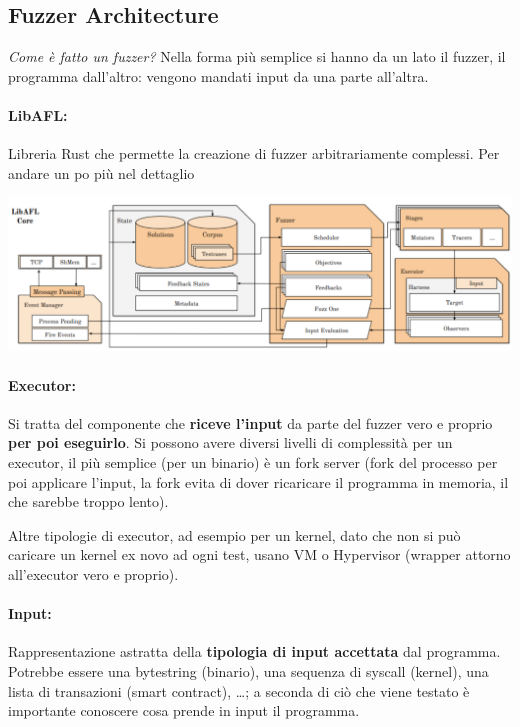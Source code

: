 \subsection{Fuzzer Architecture}

\textit{Come è fatto un fuzzer?} Nella forma più semplice si hanno da un lato il fuzzer, il programma dall'altro: vengono mandati input da una parte all'altra.

\paragraph{LibAFL:} Libreria Rust che permette la creazione di fuzzer arbitrariamente complessi. Per andare un po più nel dettaglio
\begin{center}
	\includegraphics[width=\linewidth]{img/fuzzing/fuzzercore}
\end{center}

\paragraph{Executor:} Si tratta del componente che \textbf{riceve l'input} da parte del fuzzer vero e proprio \textbf{per poi eseguirlo}. Si possono avere diversi livelli di complessità per un executor, il più semplice (per un binario) è un fork server (fork del processo per poi applicare l'input, la fork evita di dover ricaricare il programma in memoria, il che sarebbe troppo lento). 

Altre tipologie di executor, ad esempio per un kernel, dato che non si può caricare un kernel ex novo ad ogni test, usano VM o Hypervisor (wrapper attorno all'executor vero e proprio).

\paragraph{Input:} Rappresentazione astratta della \textbf{tipologia di input accettata} dal programma. Potrebbe essere una bytestring (binario), una sequenza di syscall (kernel), una lista di transazioni (smart contract), \dots; a seconda di ciò che viene testato è importante conoscere cosa prende in input il programma.

